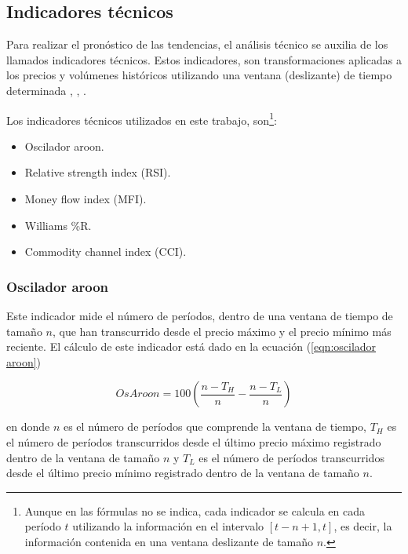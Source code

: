 \documentclass[12pt]{report}
\theoremstyle{break}
\theoremstyle{break}
\begin{document}
\subsection{Indicadores técnicos}
\label{subseccion:indicadores tecnicos}
Para realizar el pronóstico de las tendencias, el análisis técnico se auxilia de los llamados indicadores técnicos. Estos indicadores, son transformaciones aplicadas a los precios y volúmenes históricos utilizando una ventana (deslizante) de tiempo determinada \cite{murphy1999technical}, \cite{technicalAnalysisKirkPatrick}, \cite{encycoplediaTechnicalIndicators}.

Los indicadores técnicos utilizados en este trabajo, son\footnote{Aunque en las fórmulas no se indica, cada indicador se calcula en cada período $t$ utilizando la información en el intervalo $\left[t-n + 1, t\right]$, es decir, la información contenida en una ventana deslizante de tamaño $n$. }:
\begin{itemize}
\item Oscilador aroon.

\item Relative strength index (RSI).

\item Money flow index (MFI).

\item Williams \%R.

\item Commodity channel index (CCI).
\end{itemize}


\subsubsection{Oscilador aroon}
\label{subsubseccion:Oscilador Aroon}
Este indicador mide el número de períodos, dentro de una ventana de tiempo de tamaño $n$, que han transcurrido desde el precio máximo y el precio mínimo más reciente. El cálculo de este indicador está dado en la ecuación (\ref{eqn:oscilador aroon})

\begin{equation} \label{eqn:oscilador aroon}
OsAroon = 100 \left( \dfrac{  n - T_H  } { n } - \dfrac{  n - T_L  } { n } \right)
\end{equation}

en donde $n$ es el número de períodos que comprende la ventana de tiempo, $T_H$ es el número de períodos transcurridos desde el último precio máximo registrado dentro de la ventana de tamaño $n$ y $T_L$ es el número de períodos transcurridos desde el último precio mínimo registrado dentro de la ventana de tamaño $n$.
\end{document}
